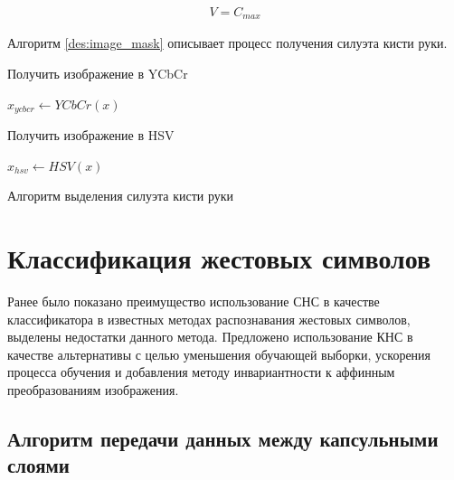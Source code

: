 \begin{eqnarray}
V = C_{max}
\end{eqnarray}

Алгоритм \ref{des:image_mask} описывает процесс получения силуэта кисти руки.

\begin{algorithm}[H]
	\label{des:image_mask}
	\SetAlgoLined
	
	Получить изображение в YCbCr
	
	$x_{ycbcr} \leftarrow YCbCr(x)$
	
	Получить изображение в HSV
	
	$x_{hsv} \leftarrow HSV(x)$
	
	
	\caption{Алгоритм выделения силуэта кисти руки}
\end{algorithm}

\section{Классификация жестовых символов}

Ранее было показано преимущество использование СНС в качестве классификатора в известных методах распознавания жестовых символов, выделены недостатки данного метода. Предложено использование КНС в качестве альтернативы с целью уменьшения обучающей выборки, ускорения процесса обучения и добавления методу инвариантности к аффинным преобразованиям изображения.

\subsection{Алгоритм передачи данных между капсульными слоями}

